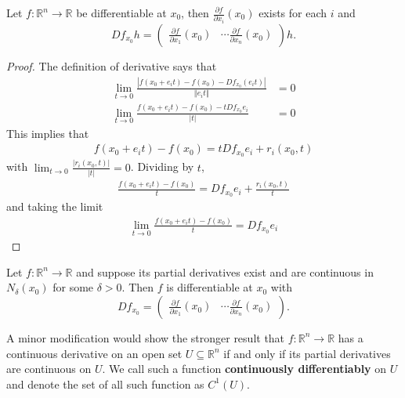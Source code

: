 \documentclass[compress]{beamer}
\def\R{\mathbb{R}}
\newcommand{\norm}[1]{\left\Vert {#1} \right\Vert}
\renewcommand{\to}{{\rightarrow}}
\begin{document}
\begin{frame}
  \begin{theorem}\label{thm:tdiff}
    Let $f: \R^n \to \R$ be differentiable at $x_0$, then
    $\frac{\partial f}{\partial x_i}(x_0)$ exists for each $i$ and 
    \[ Df_{x_0} h = \begin{pmatrix} \frac{ \partial f}{\partial x_1}(x_0) &
      \cdots \frac{ \partial f}{\partial x_n }(x_0)
    \end{pmatrix} h. \]
  \end{theorem}
\end{frame}

\begin{frame}
  \begin{proof}
    The definition of derivative says that
    \begin{align*}
      \lim_{t \to 0} \frac{\left|f(x_0 + e_i t) - f(x_0) - Df_{x_0} (e_i t)\right|}
      {\norm{e_i t} } & = 0 \\
      \lim_{t \to 0} \frac{f(x_0 + e_i t) - f(x_0) - t D f_{x_0} e_i}
      {|t| } & =  0
    \end{align*}
    This implies that
    \begin{align*}
      f(x_0 + e_i t) - f(x_0) = t D f_{x_0} e_i + r_i(x_0,t)
    \end{align*}
    with $\lim_{t \to 0} \frac{|r_i(x_0,t)|}{|t|} = 0$. Dividing by $t$, 
    \begin{align*}
      \frac{f(x_0 + e_i t) - f(x_0)}{t} = D f_{x_0} e_i + \frac{r_i(x_0,t)}{t}
    \end{align*}
    and taking the limit
    \begin{align*}
      \lim_{t \to 0} \frac{f(x_0 + e_i t) - f(x_0)}{t} = D f_{x_0} e_i 
    \end{align*}
  \end{proof}
\end{frame}

\begin{frame}
  \begin{theorem}\label{thm:ptdiff}
    Let $f:\R^n \to \R$ and suppose its partial derivatives exist and
    are continuous in $N_\delta(x_0)$ for some $\delta>0$. Then $f$
    is differentiable at $x_0$ with 
    \[ Df_{x_0}= \begin{pmatrix} \frac{ \partial f}{\partial x_1}(x_0) &
      \cdots \frac{ \partial f}{\partial x_n }(x_0)
    \end{pmatrix}. \]
  \end{theorem}
  A minor modification would show the stronger result that $f:\R^n \to
  \R$ has a continuous derivative on an open set $U \subseteq \R^n$ if
  and only if its partial derivatives are continuous on $U$. We call
  such a function \textbf{continuously differentiably} on $U$ and
  denote the set of all such function as $C^1(U)$.
\end{frame}
\end{document}
